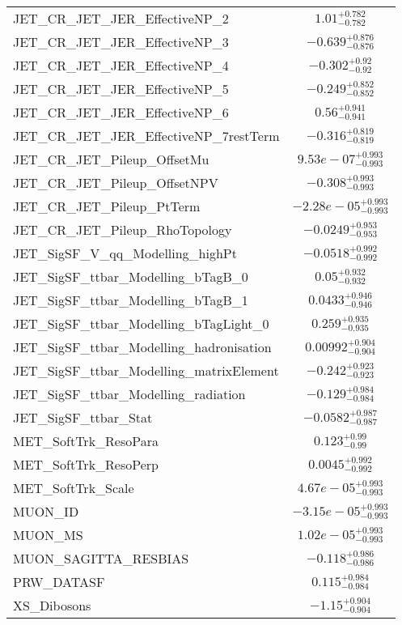\begin{tabular}{|l|c|}
JET\_CR\_JET\_JER\_EffectiveNP\_2 & $1.01^{+0.782}_{-0.782}$ \\
JET\_CR\_JET\_JER\_EffectiveNP\_3 & $-0.639^{+0.876}_{-0.876}$ \\
JET\_CR\_JET\_JER\_EffectiveNP\_4 & $-0.302^{+0.92}_{-0.92}$ \\
JET\_CR\_JET\_JER\_EffectiveNP\_5 & $-0.249^{+0.852}_{-0.852}$ \\
JET\_CR\_JET\_JER\_EffectiveNP\_6 & $0.56^{+0.941}_{-0.941}$ \\
JET\_CR\_JET\_JER\_EffectiveNP\_7restTerm & $-0.316^{+0.819}_{-0.819}$ \\
JET\_CR\_JET\_Pileup\_OffsetMu & $9.53e-07^{+0.993}_{-0.993}$ \\
JET\_CR\_JET\_Pileup\_OffsetNPV & $-0.308^{+0.993}_{-0.993}$ \\
JET\_CR\_JET\_Pileup\_PtTerm & $-2.28e-05^{+0.993}_{-0.993}$ \\
JET\_CR\_JET\_Pileup\_RhoTopology & $-0.0249^{+0.953}_{-0.953}$ \\
JET\_SigSF\_V\_qq\_Modelling\_highPt & $-0.0518^{+0.992}_{-0.992}$ \\
JET\_SigSF\_ttbar\_Modelling\_bTagB\_0 & $0.05^{+0.932}_{-0.932}$ \\
JET\_SigSF\_ttbar\_Modelling\_bTagB\_1 & $0.0433^{+0.946}_{-0.946}$ \\
JET\_SigSF\_ttbar\_Modelling\_bTagLight\_0 & $0.259^{+0.935}_{-0.935}$ \\
JET\_SigSF\_ttbar\_Modelling\_hadronisation & $0.00992^{+0.904}_{-0.904}$ \\
JET\_SigSF\_ttbar\_Modelling\_matrixElement & $-0.242^{+0.923}_{-0.923}$ \\
JET\_SigSF\_ttbar\_Modelling\_radiation & $-0.129^{+0.984}_{-0.984}$ \\
JET\_SigSF\_ttbar\_Stat & $-0.0582^{+0.987}_{-0.987}$ \\
MET\_SoftTrk\_ResoPara & $0.123^{+0.99}_{-0.99}$ \\
MET\_SoftTrk\_ResoPerp & $0.0045^{+0.992}_{-0.992}$ \\
MET\_SoftTrk\_Scale & $4.67e-05^{+0.993}_{-0.993}$ \\
MUON\_ID & $-3.15e-05^{+0.993}_{-0.993}$ \\
MUON\_MS & $1.02e-05^{+0.993}_{-0.993}$ \\
MUON\_SAGITTA\_RESBIAS & $-0.118^{+0.986}_{-0.986}$ \\
PRW\_DATASF & $0.115^{+0.984}_{-0.984}$ \\
XS\_Dibosons & $-1.15^{+0.904}_{-0.904}$ \\

\end{tabular}
